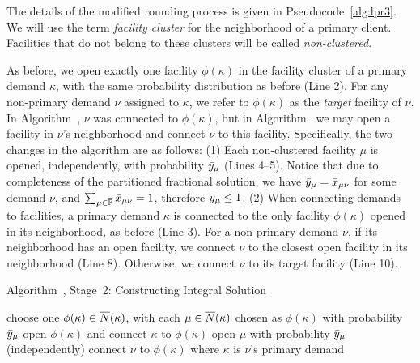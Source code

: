 \documentclass[11pt]{article}
\begin{document}
The details of the modified rounding process is given in
Pseudocode~\ref{alg:lpr3}.  We will use the term
\emph{facility cluster} for the neighborhood of a primary
client. Facilities that do not belong to these clusters will
be called \emph{non-clustered}.

As before, we open exactly one facility $\phi(\kappa)$ in
the facility cluster of a primary demand $\kappa$, with the
same probability distribution as before (Line 2).  For any
non-primary demand $\nu$ assigned to $\kappa$, we refer to
$\phi(\kappa)$ as the \emph{target} facility of $\nu$.  In
Algorithm~{\EGUP}, $\nu$ was connected to $\phi(\kappa)$,
but in Algorithm~{\ECHU} we may open a facility in $\nu$'s
neighborhood and connect $\nu$ to this facility.
Specifically, the two changes in the algorithm are as
follows: (1) Each non-clustered facility $\mu$ is opened,
independently, with probability ${\bar y}_{\mu}$ (Lines
4--5). Notice that due to completeness of the partitioned
fractional solution, we have ${\bar y}_{\mu}={\bar x}_{\mu\nu}$
for some demand $\nu$, and $\sum_{\mu\in\overline{\mathbb{F}}}
{\bar x}_{\mu\nu} = 1$, therefore ${\bar y}_{\mu}\leq 1$.  (2)
When connecting demands to facilities, a primary demand
$\kappa$ is connected to the only facility $\phi(\kappa)$
opened in its neighborhood, as before (Line 3).  For a
non-primary demand $\nu$, if its neighborhood has an open
facility, we connect $\nu$ to the closest open facility in
its neighborhood (Line 8). Otherwise, we connect $\nu$ to
its target facility (Line 10).


\begin{algorithm}
  \caption{Algorithm~{\ECHU}, Stage~2:
    Constructing Integral Solution}
  \label{alg:lpr3}
  \begin{algorithmic}[1]
    \State choose one $\phi(\kappa)\in {\overline{N}}(\kappa)$,
    with each $\mu\in{\overline{N}}(\kappa)$ chosen as $\phi(\kappa)$
    with probability ${\bar y}_\mu$
    \State open $\phi(\kappa)$ and connect $\kappa$ to $\phi(\kappa)$
    \EndFor
    \State open $\mu$ with probability ${\bar y}_\mu$ (independently)
    \EndFor
    \Else
    \State connect $\nu$ to $\phi(\kappa)$ where $\kappa$ is $\nu$'s
     primary demand
    \EndIf
    \EndFor
  \end{algorithmic}
\end{algorithm}
\end{document}

